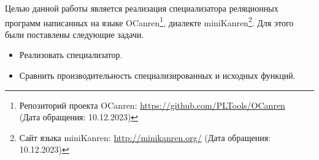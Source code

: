
\label{sec:task}
 Целью данной работы является реализация специализатора реляционных программ написанных на языке OCanren\footnote{Репозиторий проекта OCanren: \url{https://github.com/PLTools/OCanren} \\
(Дата обращения: 10.12.2023)}, диалекте miniKanren\footnote{Сайт языка miniKanren: \url{http://minikanren.org/} 
(Дата обращения: 10.12.2023)}. Для этого были поставлены следующие задачи.
 \begin{itemize}
 \item Реализовать специализатор.
 \item Сравнить производительность специализированных и исходных функций.
 \end{itemize}

